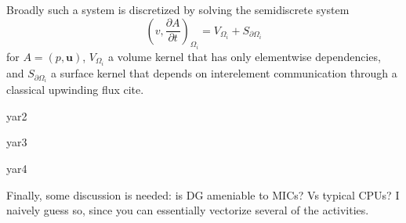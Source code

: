 Broadly such a system is discretized by solving the semidiscrete system \[ \left( v, \frac{ \partial A}{\partial t} \right)_{\Omega_{i}}= V_{\Omega_{i}}+S_{\partial\Omega_{i}} \] for $A = (p,\boldsymbol{u})$, $V_{\Omega_{i}}$ a volume kernel that has only elementwise dependencies, and $S_{\partial\Omega_{i}}$ a surface kernel that depends on interelement communication through a classical upwinding flux cite.  

%
%

yar2

yar3

yar4


Finally, some discussion is needed: is DG ameniable to MICs? Vs typical CPUs? I
naively guess so, since you can essentially vectorize several of the
activities.

